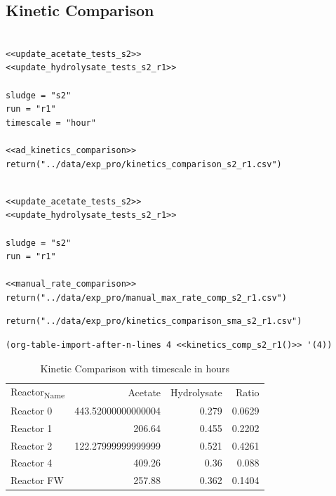 \documentclass[11pt]{article}
\begin{document}
\subsection{Kinetic Comparison}
\label{sec:org9069ee2}
\begin{verbatim}

<<update_acetate_tests_s2>>
<<update_hydrolysate_tests_s2_r1>>

sludge = "s2"
run = "r1"
timescale = "hour"

<<ad_kinetics_comparison>>
return("../data/exp_pro/kinetics_comparison_s2_r1.csv")
\end{verbatim}

\begin{verbatim}

<<update_acetate_tests_s2>>
<<update_hydrolysate_tests_s2_r1>>

sludge = "s2"
run = "r1"

<<manual_rate_comparison>>
return("../data/exp_pro/manual_max_rate_comp_s2_r1.csv")

\end{verbatim}

\begin{verbatim}
return("../data/exp_pro/kinetics_comparison_sma_s2_r1.csv")
\end{verbatim}

\begin{verbatim}
(org-table-import-after-n-lines 4 <<kinetics_comp_s2_r1()>> '(4))
\end{verbatim}

\begin{table}[htbp]
\caption{Kinetic Comparison with timescale in hours}
\centering
\begin{tabular}{lrrr}
Reactor\textsubscript{Name} & Acetate & Hydrolysate & Ratio\\[0pt]
Reactor 0 & 443.52000000000004 & 0.279 & 0.0629\\[0pt]
Reactor 1 & 206.64 & 0.455 & 0.2202\\[0pt]
Reactor 2 & 122.27999999999999 & 0.521 & 0.4261\\[0pt]
Reactor 4 & 409.26 & 0.36 & 0.088\\[0pt]
Reactor FW & 257.88 & 0.362 & 0.1404\\[0pt]
\end{tabular}
\end{table}
\end{document}
